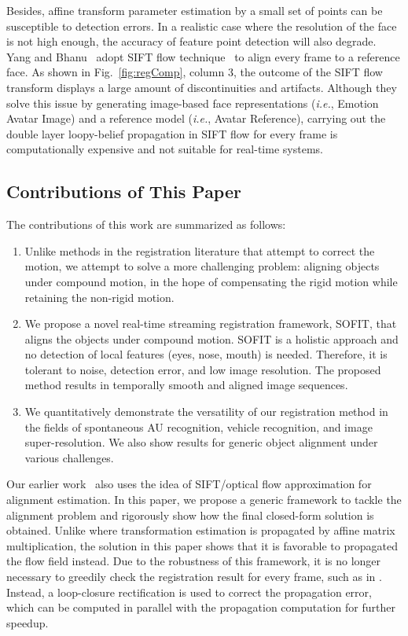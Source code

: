 \documentclass[10pt,journal]{IEEEtran}
\begin{document}
Besides, affine transform parameter estimation by a small set of points can be susceptible to detection errors. In a realistic case where the resolution of the face is not high enough, the accuracy of feature point detection will also degrade. Yang and Bhanu~\cite{Yang_SMCB12} adopt SIFT flow technique~\cite{Liu_PAMI11} to align every frame to a reference face. As shown in Fig.~\ref{fig:regComp}, column 3, the outcome of the SIFT flow transform displays a large amount of discontinuities and artifacts. Although they solve this issue by generating image-based face representations (\textit{i.e.}, Emotion Avatar Image) and a reference model (\textit{i.e.}, Avatar Reference), carrying out the double layer loopy-belief propagation in SIFT flow for every frame is computationally expensive and not suitable for real-time systems.

\subsection{\label{sec:contribution}Contributions of This Paper}

The contributions of this work are summarized as follows:

\begin{enumerate}
\item Unlike methods in the registration literature that attempt to correct the motion, we attempt to solve a more challenging problem: aligning objects under compound motion, in the hope of compensating the rigid motion while retaining the non-rigid motion.
\item We propose a novel real-time streaming registration framework, SOFIT, that aligns the objects under compound motion. SOFIT is a holistic approach and no detection of local features (eyes, nose, mouth) is needed. Therefore, it is tolerant to noise, detection error, and low image resolution. The proposed method results in temporally smooth and aligned image sequences.
\item We quantitatively demonstrate the versatility of our registration method in the fields of spontaneous AU recognition, vehicle recognition, and image super-resolution. We also show results for generic object alignment under various challenges.
\end{enumerate}

Our earlier work~\cite{Yang_FG13} also uses the idea of SIFT/optical flow approximation for alignment estimation. In this paper, we propose a generic framework to tackle the alignment problem and rigorously show how the final closed-form solution is obtained. Unlike \cite{Yang_FG13} where transformation estimation is propagated by affine matrix multiplication, the solution in this paper shows that it is favorable to propagated the flow field instead. Due to the robustness of this framework, it is no longer necessary to greedily check the registration result for every frame, such as in \cite{Yang_FG13}. Instead, a loop-closure rectification is used to correct the propagation error, which can be computed in parallel with the propagation computation for further speedup. 
\end{document}
